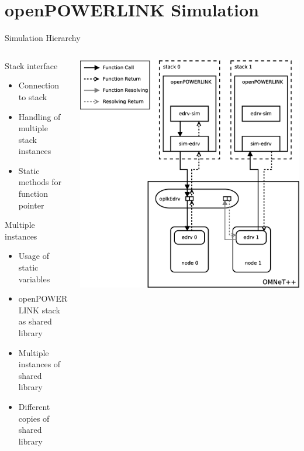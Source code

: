 \section{openPOWERLINK Simulation}

\begin{frame}{Simulation Hierarchy}
    \begin{columns}
        \begin{column}{0.6\textwidth}
            \begin{block}{Stack interface}
                \begin{itemize}
                    \item Connection to stack
                    \item Handling of multiple stack instances
                    \item Static methods for function pointer
                \end{itemize}
            \end{block}
            \begin{block}{Multiple instances}
                 \begin{itemize}
                     \item Usage of static variables
                     \item openPOWERLINK stack as shared library
                     \item Multiple instances of shared library
                     \item Different copies of shared library
                \end{itemize}
            \end{block}
        \end{column}
        \begin{column}{0.5\textwidth}
            \hspace{-1.7cm}
            \includegraphics[height=0.85\textheight]{../../thesis/images/simulation_instances.eps}

\end{column}
\end{columns}
\end{frame}
